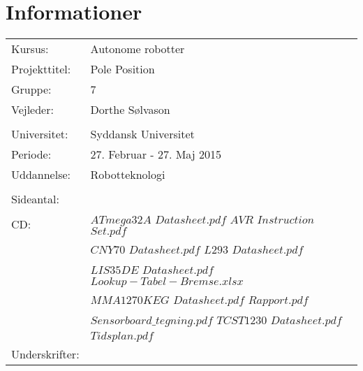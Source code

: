 \section*{Informationer}
\begin{tabularx}{\hsize}{lX}
Kursus:		    &	Autonome robotter\\
Projekttitel:	&	Pole Position\\
Gruppe:			&	7\\
Vejleder:		&	Dorthe Sølvason\\
\\
Universitet:	&	Syddansk Universitet\\
Periode:		&	27. Februar - 27. Maj 2015\\
Uddannelse:		&	Robotteknologi\\
\\
Sideantal:		&	\pageref{LastPage} \\
CD:				&	$ATmega32A$ $Datasheet.pdf$     \hspace{1.85cm}   $AVR$ $Instruction$ $Set.pdf$ \\
                &   $CNY70$ $Datasheet.pdf$         \hspace{2.6cm}   $L293$ $Datasheet.pdf$ \\
                &   $LIS35DE$ $Datasheet.pdf$       \hspace{2.3cm}   $Lookup-Tabel-Bremse.xlsx$ \\
                &   $MMA1270KEG$ $Datasheet.pdf$    \hspace{1.05cm}   $Rapport.pdf$ \\
                &   $Sensorboard\_tegning.pdf$      \hspace{2.1cm}   $TCST1230$ $Datasheet.pdf$ \\
                &   $Tidsplan.pdf$

\\

Underskrifter:\\
\end{tabularx}
\vspace{1.3cm}


